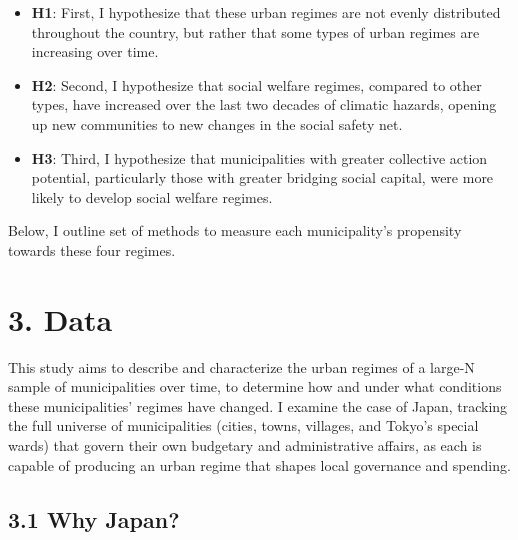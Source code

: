 \documentclass[preprint, 3p,
authoryear]{elsarticle} %
\begin{document}
\begin{itemize}
\item
  \textbf{H1}: First, I hypothesize that these urban regimes are not
  evenly distributed throughout the country, but rather that some types
  of urban regimes are increasing over time.
\item
  \textbf{H2}: Second, I hypothesize that social welfare regimes,
  compared to other types, have increased over the last two decades of
  climatic hazards, opening up new communities to new changes in the
  social safety net.
\item
  \textbf{H3}: Third, I hypothesize that municipalities with greater
  collective action potential, particularly those with greater bridging
  social capital, were more likely to develop social welfare regimes.
\end{itemize}

Below, I outline set of methods to measure each municipality's
propensity towards these four regimes.

\hypertarget{data}{%
\section{3. Data}\label{data}}

This study aims to describe and characterize the urban regimes of a
large-N sample of municipalities over time, to determine how and under
what conditions these municipalities' regimes have changed. I examine
the case of Japan, tracking the full universe of municipalities (cities,
towns, villages, and Tokyo's special wards) that govern their own
budgetary and administrative affairs, as each is capable of producing an
urban regime that shapes local governance and spending.

\hypertarget{why-japan}{%
\subsection{3.1 Why Japan?}\label{why-japan}}
\end{document}

